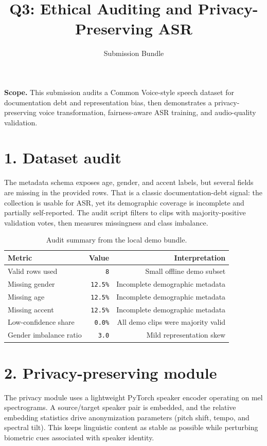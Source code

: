 \documentclass[10pt]{article}
\title{\vspace{-1.3cm}Q3: Ethical Auditing and Privacy-Preserving ASR}
\author{Submission Bundle}
\date{}
\begin{document}
\maketitle

\textbf{Scope.} This submission audits a Common Voice-style speech dataset for documentation debt and representation bias, then demonstrates a privacy-preserving voice transformation, fairness-aware ASR training, and audio-quality validation.

\section*{1. Dataset audit}
The metadata schema exposes age, gender, and accent labels, but several fields are missing in the provided rows. That is a classic documentation-debt signal: the collection is usable for ASR, yet its demographic coverage is incomplete and partially self-reported. The audit script filters to clips with majority-positive validation votes, then measures missingness and class imbalance.

\begin{table}[h]
\centering
\small
\begin{tabular}{lrr}
\toprule
Metric & Value & Interpretation \\
\midrule
Valid rows used & \texttt{8} & Small offline demo subset \\
Missing gender & \texttt{12.5\%} & Incomplete demographic metadata \\
Missing age & \texttt{12.5\%} & Incomplete demographic metadata \\
Missing accent & \texttt{12.5\%} & Incomplete demographic metadata \\
Low-confidence share & \texttt{0.0\%} & All demo clips were majority valid \\
Gender imbalance ratio & \texttt{3.0} & Mild representation skew \\
\bottomrule
\end{tabular}
\caption{Audit summary from the local demo bundle.}
\end{table}

\section*{2. Privacy-preserving module}
The privacy module uses a lightweight PyTorch speaker encoder operating on mel spectrograms. A source/target speaker pair is embedded, and the relative embedding statistics drive anonymization parameters (pitch shift, tempo, and spectral tilt). This keeps linguistic content as stable as possible while perturbing biometric cues associated with speaker identity.
\end{document}
